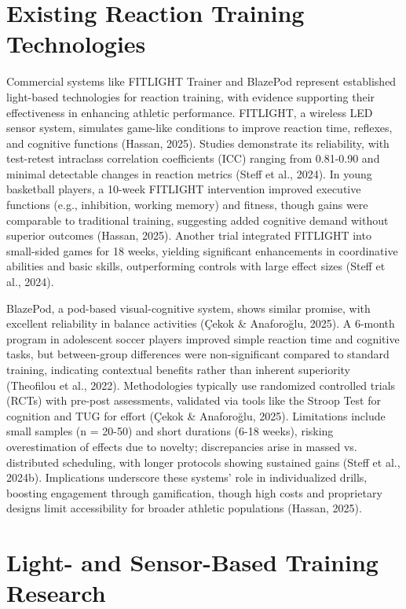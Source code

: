 \section{Existing Reaction Training Technologies}

Commercial systems like FITLIGHT Trainer and BlazePod represent established light-based technologies for reaction training, with evidence supporting their effectiveness in enhancing athletic performance. FITLIGHT, a wireless LED sensor system, simulates game-like conditions to improve reaction time, reflexes, and cognitive functions (Hassan, 2025). Studies demonstrate its reliability, with test-retest intraclass correlation coefficients (ICC) ranging from 0.81-0.90 and minimal detectable changes in reaction metrics (Steff et al., 2024). In young basketball players, a 10-week FITLIGHT intervention improved executive functions (e.g., inhibition, working memory) and fitness, though gains were comparable to traditional training, suggesting added cognitive demand without superior outcomes (Hassan, 2025). Another trial integrated FITLIGHT into small-sided games for 18 weeks, yielding significant enhancements in coordinative abilities and basic skills, outperforming controls with large effect sizes (Steff et al., 2024).

BlazePod, a pod-based visual-cognitive system, shows similar promise, with excellent reliability in balance activities (Çekok & Anaforoğlu, 2025). A 6-month program in adolescent soccer players improved simple reaction time and cognitive tasks, but between-group differences were non-significant compared to standard training, indicating contextual benefits rather than inherent superiority (Theofilou et al., 2022). Methodologies typically use randomized controlled trials (RCTs) with pre-post assessments, validated via tools like the Stroop Test for cognition and TUG for effort (Çekok & Anaforoğlu, 2025). Limitations include small samples (n = 20-50) and short durations (6-18 weeks), risking overestimation of effects due to novelty; discrepancies arise in massed vs. distributed scheduling, with longer protocols showing sustained gains (Steff et al., 2024b). Implications underscore these systems' role in individualized drills, boosting engagement through gamification, though high costs and proprietary designs limit accessibility for broader athletic populations (Hassan, 2025).


\section{Light- and Sensor-Based Training Research}

